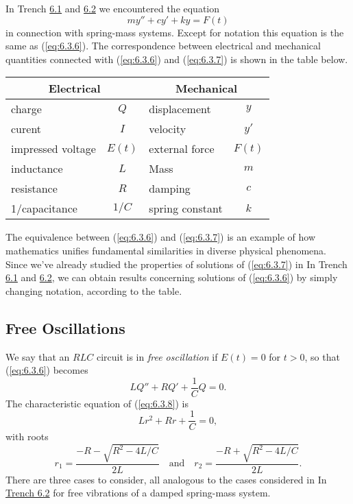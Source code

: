 \documentclass{ximera}
\begin{document}
In Trench \href{https://ximera.osu.edu/ode/main/springProblemsI/springProblemsI}{6.1} and \href{https://ximera.osu.edu/ode/main/springProblemsII/springProblemsII}{6.2} we encountered the
equation
\begin{equation} \label{eq:6.3.7}
my''+cy'+ky=F(t)
\end{equation}
in connection with spring-mass systems. Except for notation this
equation is the same as (\ref{eq:6.3.6}). The correspondence between
electrical and mechanical quantities connected with (\ref{eq:6.3.6}) and
(\ref{eq:6.3.7}) is shown in the table below.

\begin{center}
\begin{tabular}{|lc|lc|}\hline
\multicolumn{2}{|c|}{\bf Electrical}&
\multicolumn{2}{c|}{\bf Mechanical}\\\hline
charge& $Q$& displacement&$y$\\\hline
curent&$I$&velocity&$y'$\\\hline
impressed voltage&$E(t)$&external force&$F(t)$\\\hline
inductance&$L$&Mass&$m$\\\hline
resistance&$R$&damping&$c$\\\hline
1/capacitance&$1/C$&spring constant&$k$\\\hline
\end{tabular}
\end{center}

The equivalence between (\ref{eq:6.3.6}) and (\ref{eq:6.3.7}) is an example of
how mathematics unifies fundamental similarities in diverse physical
phenomena. Since we've already studied the properties of solutions of
(\ref{eq:6.3.7}) in In Trench \href{https://ximera.osu.edu/ode/main/springProblemsI/springProblemsI}{6.1} and \href{https://ximera.osu.edu/ode/main/springProblemsII/springProblemsII}{6.2}, we
can obtain
results concerning solutions of (\ref{eq:6.3.6}) by simply changing
notation, according to the table.

\subsection*{Free Oscillations}

We say that an $RLC$ circuit is in \textit{free oscillation} if $E(t)=0$
for $t>0$, so that (\ref{eq:6.3.6}) becomes
\begin{equation} \label{eq:6.3.8}
LQ''+RQ'+\frac{1}{C}Q=0.
\end{equation}
The characteristic equation of (\ref{eq:6.3.8}) is
$$
Lr^2+Rr+\frac{1}{C}=0,
$$
with roots
\begin{equation}\label{eq:6.3.9}
r_1=\frac{-R-\sqrt{R^2-4L/C}}{2L}\quad\mbox{and}\quad r_2=
\frac{-R+\sqrt{R^2-4L/C}}{2L}.
\end{equation}
There are three cases to consider, all analogous to the cases
considered in In \href{https://ximera.osu.edu/ode/main/springProblemsII/springProblemsII}{Trench 6.2} for free vibrations of a damped
spring-mass system.
\end{document}
